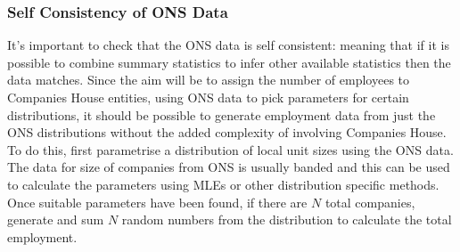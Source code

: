 \documentclass[a4paper,10pt]{article}
\begin{document}
\subsubsection{Self Consistency of ONS Data}
It's important to check that the ONS data is self consistent: meaning that if it is possible to combine summary statistics to infer other available statistics then the data matches. Since the aim will be to assign the number of employees to Companies House entities, using ONS data to pick parameters for certain distributions, it should be possible to generate employment data from just the ONS distributions without the added complexity of involving Companies House. To do this, first parametrise a distribution of local unit sizes using the ONS data. The data for size of companies from ONS is usually banded and this can be used to calculate the parameters using MLEs or other distribution specific methods. Once suitable parameters have been found, if there are $N$ total companies, generate and sum $N$ random numbers from the distribution to calculate the total employment.
\end{document}
